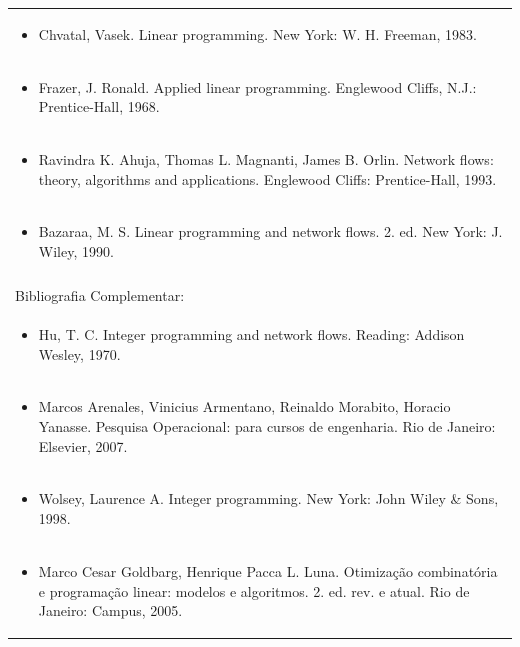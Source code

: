 \documentclass[11pt]{article}
\begin{document}
\begin{center}
\begin{longtable}{|p{4cm}|p{4cm}|p{4cm}|p{4cm}|}
\multicolumn{4}{|p{\dimexpr 16cm + 6\tabcolsep\relax}|}{\begin{itemize}\item Chvatal, Vasek. Linear programming. New York: W. H. Freeman, 1983.\end{itemize}}\\
\multicolumn{4}{|p{\dimexpr 16cm + 6\tabcolsep\relax}|}{\begin{itemize}\item Frazer, J. Ronald. Applied linear programming. Englewood Cliffs, N.J.: Prentice-Hall, 1968.\end{itemize}}\\
\multicolumn{4}{|p{\dimexpr 16cm + 6\tabcolsep\relax}|}{\begin{itemize}\item Ravindra K. Ahuja, Thomas L. Magnanti, James B. Orlin. Network flows: theory, algorithms and applications. Englewood Cliffs: Prentice-Hall, 1993.\end{itemize}}\\
\multicolumn{4}{|p{\dimexpr 16cm + 6\tabcolsep\relax}|}{\begin{itemize}\item Bazaraa, M. S. Linear programming and network flows. 2. ed. New York: J. Wiley, 1990.\end{itemize}}\\
\multicolumn{4}{|p{16cm}|}{}\\
\hline
\multicolumn{4}{|p{16cm}|}{Bibliografia Complementar:}\\*
\multicolumn{4}{|p{\dimexpr 16cm + 6\tabcolsep\relax}|}{\begin{itemize}\item Hu, T. C. Integer programming and network flows. Reading: Addison Wesley, 1970.\end{itemize}}\\
\multicolumn{4}{|p{\dimexpr 16cm + 6\tabcolsep\relax}|}{\begin{itemize}\item Marcos Arenales, Vinicius Armentano, Reinaldo Morabito, Horacio Yanasse. Pesquisa Operacional: para cursos de engenharia. Rio de Janeiro: Elsevier, 2007.\end{itemize}}\\
\multicolumn{4}{|p{\dimexpr 16cm + 6\tabcolsep\relax}|}{\begin{itemize}\item Wolsey, Laurence A. Integer programming. New York: John Wiley \& Sons, 1998.\end{itemize}}\\
\multicolumn{4}{|p{\dimexpr 16cm + 6\tabcolsep\relax}|}{\begin{itemize}\item Marco Cesar Goldbarg, Henrique Pacca L. Luna. Otimização combinatória e programação linear: modelos e algoritmos. 2. ed. rev. e atual. Rio de Janeiro: Campus, 2005.\end{itemize}}\\
\hline
\end{longtable}
\end{center}
\end{document}
